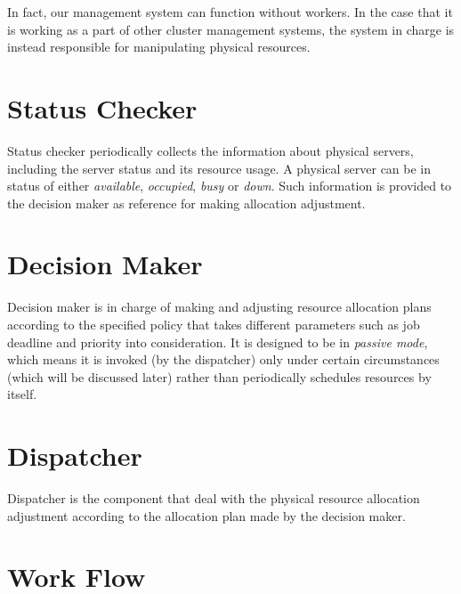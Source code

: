 In fact, our management system can function without workers.  In the
case that it is working as a part of other cluster management systems,
the system in charge is instead responsible for manipulating physical
resources.

\section{Status Checker}

Status checker periodically collects the information about physical
servers, including the server status and its resource usage.  A physical
server can be in status of either \emph{available}, \emph{occupied},
\emph{busy} or \emph{down}.
Such information is provided to the decision maker as reference
for making allocation adjustment.  

\section{Decision Maker}

Decision maker is in charge of making and adjusting resource
allocation plans according to the specified policy that takes different
parameters such as job deadline and priority into consideration. It is
designed to be in \emph{passive mode}, which means it is invoked (by the
dispatcher) only under certain circumstances (which will be discussed
later) rather than periodically schedules resources by itself.

\section{Dispatcher}

Dispatcher is the component that deal with the physical resource
allocation adjustment according to the allocation plan made by the
decision maker.

\section{Work Flow}


